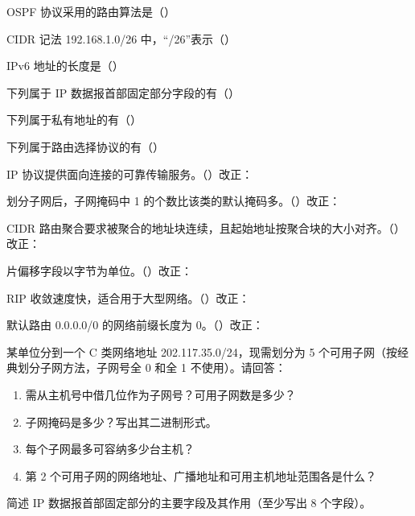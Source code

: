 \documentclass[a4paper,11pt]{article}
\begin{document}
\q OSPF 协议采用的路由算法是（\quad）

\q CIDR 记法 192.168.1.0/26 中，“/26”表示（\quad）

\q IPv6 地址的长度是（\quad）

\q 下列属于 IP 数据报首部固定部分字段的有（\quad）

\q 下列属于私有地址的有（\quad）

\q 下列属于路由选择协议的有（\quad）

\q IP 协议提供面向连接的可靠传输服务。\quad（\quad）\quad 改正：\fixblank

\q 划分子网后，子网掩码中 1 的个数比该类的默认掩码多。\quad（\quad）\quad 改正：\fixblank

\q CIDR 路由聚合要求被聚合的地址块连续，且起始地址按聚合块的大小对齐。\quad（\quad）\quad 改正：\fixblank

\q 片偏移字段以字节为单位。\quad（\quad）\quad 改正：\fixblank

\q RIP 收敛速度快，适合用于大型网络。\quad（\quad）\quad 改正：\fixblank

\q 默认路由 0.0.0.0/0 的网络前缀长度为 0。\quad（\quad）\quad 改正：\fixblank

\q 某单位分到一个 C 类网络地址 202.117.35.0/24，现需划分为 5 个可用子网（按经典划分子网方法，子网号全 0 和全 1 不使用）。请回答：
\begin{enumerate}[leftmargin=2em, itemsep=1pt, topsep=2pt]
  \item 需从主机号中借几位作为子网号？可用子网数是多少？
  \item 子网掩码是多少？写出其二进制形式。
  \item 每个子网最多可容纳多少台主机？
  \item 第 2 个可用子网的网络地址、广播地址和可用主机地址范围各是什么？
\end{enumerate}
\anslines{5cm}

\newpage
{}
\q 简述 IP 数据报首部固定部分的主要字段及其作用（至少写出 8 个字段）。\anslines{4cm}
\end{document}
